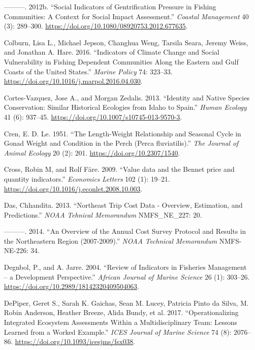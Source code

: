 \documentclass[
]{book}
\newlength{\cslhangindent}
\newenvironment{cslreferences}%
  {\setlength{\parindent}{0pt}%
  \everypar{\setlength{\hangindent}{\cslhangindent}}\ignorespaces}%
  {\par}
\begin{document}
\begin{cslreferences}
\leavevmode\hypertarget{ref-colburn_social_2012}{}%
---------. 2012b. ``Social Indicators of Gentrification Pressure in Fishing Communities: A Context for Social Impact Assessment.'' \emph{Coastal Management} 40 (3): 289--300. \url{https://doi.org/10.1080/08920753.2012.677635}.

\leavevmode\hypertarget{ref-colburn_indicators_2016}{}%
Colburn, Lisa L., Michael Jepson, Changhua Weng, Tarsila Seara, Jeremy Weiss, and Jonathan A. Hare. 2016. ``Indicators of Climate Change and Social Vulnerability in Fishing Dependent Communities Along the Eastern and Gulf Coasts of the United States.'' \emph{Marine Policy} 74: 323--33. \url{https://doi.org/10.1016/j.marpol.2016.04.030}.

\leavevmode\hypertarget{ref-cortes-vazquez_identity_2013}{}%
Cortes-Vazquez, Jose A., and Morgan Zedalis. 2013. ``Identity and Native Species Conservation: Similar Historical Ecologies from Idaho to Spain.'' \emph{Human Ecology} 41 (6): 937--45. \url{https://doi.org/10.1007/s10745-013-9570-3}.

\leavevmode\hypertarget{ref-Cren1951a}{}%
Cren, E. D. Le. 1951. ``The Length-Weight Relationship and Seasonal Cycle in Gonad Weight and Condition in the Perch (Perca fluviatilis).'' \emph{The Journal of Animal Ecology} 20 (2): 201. \url{https://doi.org/10.2307/1540}.

\leavevmode\hypertarget{ref-Cross2009}{}%
Cross, Robin M, and Rolf Färe. 2009. ``Value data and the Bennet price and quantity indicators.'' \emph{Economics Letters} 102 (1): 19--21. \url{https://doi.org/10.1016/j.econlet.2008.10.003}.

\leavevmode\hypertarget{ref-das_chhandita_northeast_2013}{}%
Das, Chhandita. 2013. ``Northeast Trip Cost Data - Overview, Estimation, and Predictions.'' \emph{NOAA Tehnical Memorandum} NMFS\_NE\_227: 20.

\leavevmode\hypertarget{ref-das_chhandita_overview_2014}{}%
---------. 2014. ``An Overview of the Annual Cost Survey Protocol and Results in the Northeastern Region (2007-2009).'' \emph{NOAA Technical Memorandum} NMFS-NE-226: 34.

\leavevmode\hypertarget{ref-degnbol_review_2004}{}%
Degnbol, P., and A. Jarre. 2004. ``Review of Indicators in Fisheries Management -- a Development Perspective.'' \emph{African Journal of Marine Science} 26 (1): 303--26. \url{https://doi.org/10.2989/18142320409504063}.

\leavevmode\hypertarget{ref-depiper_operationalizing_2017}{}%
DePiper, Geret S., Sarah K. Gaichas, Sean M. Lucey, Patricia Pinto da Silva, M. Robin Anderson, Heather Breeze, Alida Bundy, et al. 2017. ``Operationalizing Integrated Ecosystem Assessments Within a Multidisciplinary Team: Lessons Learned from a Worked Example.'' \emph{ICES Journal of Marine Science} 74 (8): 2076--86. \url{https://doi.org/10.1093/icesjms/fsx038}.


\end{cslreferences}
\end{document}
